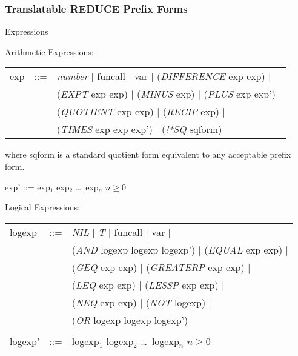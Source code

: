 \subsubsection{Translatable REDUCE Prefix Forms}
\begin{describe}{Expressions}

Arithmetic Expressions:

\begin{tabular}{lll}
exp & ::= & {\it number\/} $\mid$  funcall  $\mid$  var  $\mid$
({\it DIFFERENCE\/} exp exp) $\mid$\\
& &({\it EXPT\/} exp exp)  $\mid$  ({\it MINUS\/} exp)  $\mid$  ({\it PLUS\/}
 exp exp') $\mid$\\
& & ({\it QUOTIENT\/} exp exp)  $\mid$  ({\it RECIP\/} exp) $\mid$\\
& & ({\it TIMES\/} exp exp exp')  $\mid$  ({\it !*SQ\/} sqform)\\
\end{tabular}

where sqform is a standard quotient form equivalent to any acceptable prefix
form.

exp' ::=  exp$_1$ exp$_2$ \dots\  exp$_n$  $n \geq 0$

Logical Expressions:

\begin{tabular}{lll}
logexp & ::= & {\it NIL\/} $\mid$ {\it T\/} $\mid$  funcall  $\mid$  var
$\mid$\\
& &  ({\it AND\/} logexp logexp logexp')  $\mid$  ({\it EQUAL\/} exp exp)
$\mid$\\
& & ({\it GEQ\/} exp exp)  $\mid$  ({\it GREATERP\/} exp exp)  $\mid$ \\
& & ({\it LEQ\/} exp exp) $\mid$ ({\it LESSP\/} exp exp)  $\mid$ \\
& & ({\it NEQ\/} exp exp) $\mid$ ({\it NOT\/} logexp) $\mid$ \\
& & ({\it OR\/} logexp logexp logexp')\\
& &\\
logexp' & ::= & logexp$_1$ logexp$_2$ \dots\  logexp$_n$  $n \geq 0$\\
\end{tabular}
\end{describe}


